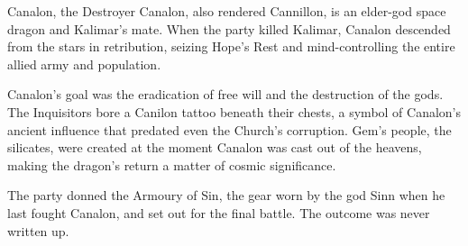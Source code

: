 \begin{DndSidebar}{Canalon, the Destroyer}
Canalon, also rendered Cannillon, is an elder-god space dragon and Kalimar's mate.  When the party killed Kalimar, Canalon descended from the stars in retribution, seizing Hope's Rest and mind-controlling the entire allied army and population.

Canalon's goal was the eradication of free will and the destruction of the gods.  The Inquisitors bore a Canilon tattoo beneath their chests, a symbol of Canalon's ancient influence that predated even the Church's corruption.  Gem's people, the silicates, were created at the moment Canalon was cast out of the heavens, making the dragon's return a matter of cosmic significance.

The party donned the Armoury of Sin, the gear worn by the god Sinn when he last fought Canalon, and set out for the final battle.  The outcome was never written up.
\end{DndSidebar}

\clearpage